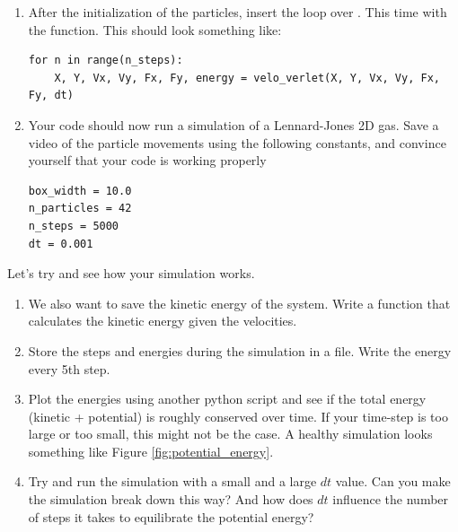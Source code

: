 \documentclass{article}
\begin{document}
\begin{enumerate}[resume]

    \item After the initialization of the particles, insert the loop over .
        This time with the  function.
        This should look something like:

\begin{lstlisting}
for n in range(n_steps):
    X, Y, Vx, Vy, Fx, Fy, energy = velo_verlet(X, Y, Vx, Vy, Fx, Fy, dt)
\end{lstlisting}

    \item Your code should now run a simulation of a Lennard-Jones 2D gas.
        Save a video of the particle movements using the following constants, and convince yourself that your code is working properly

\begin{lstlisting}
box_width = 10.0
n_particles = 42
n_steps = 5000
dt = 0.001
\end{lstlisting}

\end{enumerate}


\newpage

Let's try and see how your simulation works.

\begin{enumerate}[resume]

    \item We also want to save the kinetic energy of the system. Write a function that calculates the kinetic energy given the velocities.

    \item Store the steps and energies during the simulation in a file. Write the energy every 5th step.

    \item Plot the energies using another python script and see if the total energy (kinetic + potential) is roughly conserved over time.
        If your time-step is too large or too small, this might not be the case.
        A healthy simulation looks something like Figure \ref{fig:potential_energy}.

    \item Try and run the simulation with a small and a large $dt$ value. 
        Can you make the simulation break down this way?
        And how does $dt$ influence the number of steps it takes to equilibrate the potential energy?

\end{enumerate}
\end{document}
